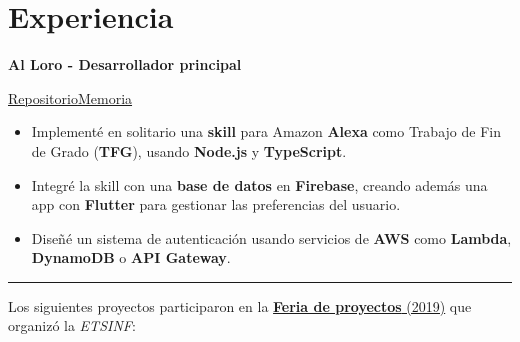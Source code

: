 \documentclass[letterpaper, 12pt, dvipsnames]{article}
\begin{document}
\pagebreak

\section{Experiencia}

\begin{center}
    \large{\textbf{Al Loro - Desarrollador principal}}\par
    \vspace{.2em}
    \href{https://github.com/algono/FeedTheParrot-RSS}{Repositorio}\hspace{1em}\href{http://hdl.handle.net/10251/174256}{Memoria}
\end{center}
\begin{itemize}
    \item Implementé en solitario una \textbf{skill} para Amazon \textbf{Alexa} como Trabajo de Fin de Grado (\textbf{TFG}), usando \textbf{Node.js} y \textbf{TypeScript}.
    \item Integré la skill con una \textbf{base de datos} en \textbf{Firebase}, creando además una app con \textbf{Flutter} para gestionar las preferencias del usuario.
    \item Diseñé un sistema de autenticación usando servicios de \textbf{AWS} como \textbf{Lambda}, \textbf{DynamoDB} o \textbf{API Gateway}.
\end{itemize}
\rule{\textwidth}{.4pt}

\vspace{.5em}

Los siguientes proyectos participaron en la \href{https://es-es.facebook.com/etsinf/videos/feria-de-proyectos-de-estudiantes-2019/1921312964681641/}{\textbf{Feria de proyectos} (2019)} que organizó la \emph{ETSINF}:

\vspace{.3em}
\end{document}
